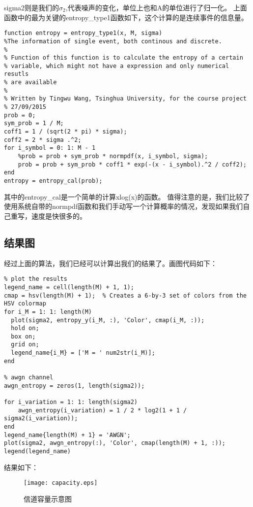 \documentclass{article}
\begin{document}
sigma2则是我们的\(\sigma_2\),代表噪声的变化，单位上也和A的单位进行了归一化。
上面函数中的最为关键的entropy\_type1函数如下，这个计算的是连续事件的信息量。
\begin{lstlisting}
function entropy = entropy_type1(x, M, sigma)
%The information of single event, both continous and discrete.
%
% Function of this function is to calculate the entropy of a certain 
% variable, which might not have a expression and only numerical resutls
% are available
%
% Written by Tingwu Wang, Tsinghua University, for the course project
% 27/09/2015
prob = 0;
sym_prob = 1 / M;
coff1 = 1 / (sqrt(2 * pi) * sigma);
coff2 = 2 * sigma .^2;
for i_symbol = 0: 1: M - 1
    %prob = prob + sym_prob * normpdf(x, i_symbol, sigma);
    prob = prob + sym_prob * coff1 * exp(-(x - i_symbol).^2 / coff2);
end
entropy = entropy_cal(prob);
\end{lstlisting}
其中的entropy\_cal是一个简单的计算xlog(x)的函数。
值得注意的是，我们比较了使用系统自带的normpdf函数和我们手动写一个计算概率的情况，发现如果我们自己重写，速度是快很多的。
\subsection{结果图}
经过上面的算法，我们已经可以计算出我们的结果了。画图代码如下：
\begin{lstlisting}
% plot the results
legend_name = cell(length(M) + 1, 1);
cmap = hsv(length(M) + 1);  % Creates a 6-by-3 set of colors from the HSV colormap
for i_M = 1: 1: length(M)
  plot(sigma2, entropy_y(i_M, :), 'Color', cmap(i_M, :));
  hold on;
  box on;
  grid on;
  legend_name{i_M} = ['M = ' num2str(i_M)];
end

% awgn channel
awgn_entropy = zeros(1, length(sigma2));

for i_variation = 1: 1: length(sigma2)
    awgn_entropy(i_variation) = 1 / 2 * log2(1 + 1 / sigma2(i_variation));
end
legend_name{length(M) + 1} = 'AWGN';
plot(sigma2, awgn_entropy(:), 'Color', cmap(length(M) + 1, :));
legend(legend_name)
\end{lstlisting}
结果如下：
\begin{figure}	
\begin{center}
		\texttt{[image: capacity.eps]}
		\caption{信道容量示意图}
\end{center}
\end{figure}
\end{document}
